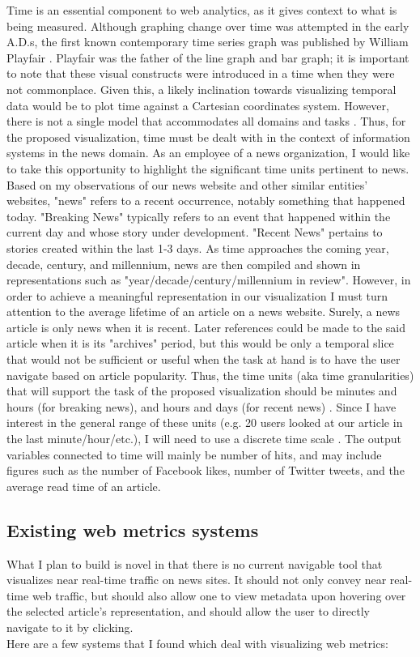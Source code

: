 \documentclass[12pt]{article}
\begin{document}
Time is an essential component to web analytics, as it gives context to what is being measured. Although graphing change over time was attempted in the early A.D.s, the first known contemporary time series graph was published by William Playfair \cite{playfair}. Playfair was the father of the line graph and bar graph; it is important to note that these visual constructs were introduced in a time when they were not commonplace. Given this, a likely inclination towards visualizing temporal data would be to plot time against a Cartesian coordinates system. However, there is not a single model that accommodates all domains and tasks \cite{frank}. Thus, for the proposed visualization, time must be dealt with in the context of information systems in the news domain. As an employee of a news organization, I would like to take this opportunity to highlight the significant time units pertinent to news. Based on my observations of our news website and other similar entities' websites, "news" refers to a recent occurrence, notably something that happened today. "Breaking News" typically refers to an event that happened within the current day and whose story under development. "Recent News" pertains to stories created within the last 1-3 days. As time approaches the coming year, decade, century, and millennium, news are then compiled and shown in representations such as "year/decade/century/millennium in review". However, in order to achieve a meaningful representation in our visualization I must turn attention to the average lifetime of an article on a news website. Surely, a news article is only news when it is recent. Later references could be made to the said article when it is its "archives" period, but this would be only a temporal slice that would not be sufficient or useful when the task at hand is to have the user navigate based on article popularity. Thus, the time units (aka time granularities) that will support the task of the proposed visualization should be minutes and hours (for breaking news), and hours and days (for recent news) \cite{bettini}. Since I have interest in the general range of these units (e.g. 20 users looked at our article in the last minute/hour/etc.), I will need to use a discrete time scale \cite{goralwalla}. The output variables connected to time will mainly be number of hits, and may include figures such as the number of Facebook likes, number of Twitter tweets, and the average read time of an article.

\subsection{Existing web metrics systems}
What I plan to build is novel in that there is no current navigable tool that visualizes near real-time traffic on news sites. It should not only convey near real-time web traffic, but should also allow one to view metadata upon hovering over the selected article's representation, and should allow the user to directly navigate to it by clicking.\\
Here are a few systems that I found which deal with visualizing web metrics: \\
\end{document}
